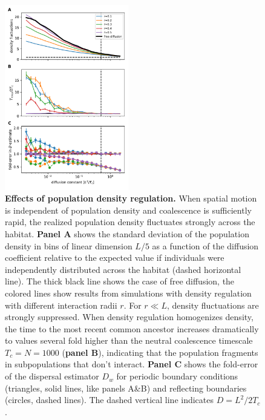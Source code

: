 \documentclass[aps,rmp, twocolumn]{revtex4}
\begin{document}
\begin{figure}[!h]
    \includegraphics[width=0.48\textwidth]{figures/Fig3}
    \caption{\label{fig:density_reg}  {\bf Effects of population density regulation.}
    When spatial motion is independent of population density and coalescence is sufficiently rapid, the realized population density fluctuates strongly across the habitat.
    {\bf Panel A} shows the standard deviation of the population density in bins of linear dimension $L/5$ as a function of the diffusion coefficient relative to the expected value if individuals were independently distributed across the habitat (dashed horizontal line). The thick black line shows the case of free diffusion, the colored lines show results from simulations with density regulation with different interaction radii $r$.
    For $r\ll L$, density fluctuations are strongly suppressed.
    When density regulation homogenizes density, the time to the most recent common ancestor increases dramatically to values several fold higher than the neutral coalescence timescale $T_c=N=1000$ ({\bf panel B}), indicating that the population fragments in subpopulations that don't interact.
    {\bf Panel C} shows the fold-error of the dispersal estimator $D_w$ for periodic boundary conditions (triangles, solid lines, like panels A\&B) and reflecting boundaries (circles, dashed lines).
    The dashed vertical line indicates $D=L^2/2T_c$.}
\end{figure}
\end{document}
